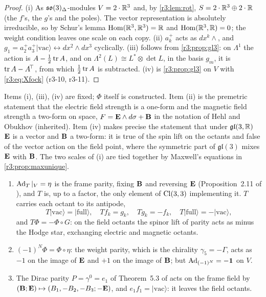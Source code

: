 \begin{proof}
(i) As $\mathfrak{so}(3)_\Delta$-modules $V=2\cdot\mathbb{R}^3$ and, by \cref{r3:lem:rot}, $S=2\cdot\mathbb{R}^3\oplus2\cdot\mathbb{R}$ (the $f$'s, the $g$'s and the poles). The
vector representation is absolutely irreducible, so by Schur's lemma \cite{GoodmanWallach} $\operatorname{Hom}(\mathbb{R}^3,\mathbb{R}^3)=\mathbb{R}$ and $\operatorname{Hom}(\mathbb{R}^3,\mathbb{R})=0$; the
weight condition leaves one scale on each copy. (ii) $a^+_k$ acts as $dx^k\wedge$, and $g_1=a^+_2a^+_3|\mathrm{vac}\rangle\leftrightarrow dx^2\wedge dx^3$
cyclically. (iii) follows from \cref{r3:prop:gl3}: on $\Lambda^1$ the action is $A-\tfrac12\operatorname{tr} A$, and on $\Lambda^2(L)\cong L^*\otimes\det L$, in the
basis $g_m$, it is $\operatorname{tr} A-A^{\!\top}$, from which $\tfrac12\operatorname{tr} A$ is subtracted. (iv) is \cref{r3:prop:gl3} on $V$ with \cref{r3:eq:Xfock}
(r3-10, r3-11).
\end{proof}

Items (i), (iii), (iv) are fixed; $\Phi$ itself is constructed. Item (ii) is the premetric statement that the electric field strength is a
one-form and the magnetic field strength a two-form on space, $F=\mathbf E\wedge d\sigma+\mathbf B$ in the notation of Hehl and Obukhov \cite{HehlObukhov03}
(inherited). Item (iv) makes precise the statement that under $\mathfrak{gl}(3,\mathbb{R})$ $\mathbf E$ is a vector and $\mathbf B$ a two-form: it is
true of the spin lift on the octants and false of the vector action on the field point, where the symmetric part of $\mathfrak{gl}(3)$
mixes $\mathbf E$ with $\mathbf B$. The two scales of (i) are tied together by Maxwell's equations in \cref{r3:prop:maxunique}.

\begin{proposition}
\label{r3:prop:parity}
\begin{enumerate}[label=(\roman*),leftmargin=2.2em]
\item $\operatorname{Ad}_T|_V=\eta$ is the frame parity, fixing $\mathbf B$ and reversing $\mathbf E$ (Proposition~2.11 of \cite{RE}), and $T$ is, up to a factor, the only
element of $\mathrm{Cl}(3,3)$ implementing it. $T$ carries each octant to its antipode,
\[
T|\mathrm{vac}\rangle=|\mathrm{full}\rangle,\quad Tf_k=g_k,\quad Tg_k=-f_k,\quad T|\mathrm{full}\rangle=-|\mathrm{vac}\rangle,
\]
and $T\Phi=-\Phi\circ G$: on the field octants the spinor lift of parity acts as minus the Hodge star, exchanging electric and magnetic octants.
\item $(-1)^N\Phi=\Phi\circ\eta$: the weight parity, which is the chirality $\gamma_5=-\Gamma$, acts as $-1$ on the image of $\mathbf E$ and $+1$ on the image
of $\mathbf B$; but $\operatorname{Ad}_{(-1)^N}=-\mathbf 1$ on $V$.
\item The Dirac parity $P=\gamma^0=e_1$ of Theorem~5.3 of \cite{ES17} acts on the frame field by
$(\mathbf B;\mathbf E)\mapsto(B_1,-B_2,-B_3;-\mathbf E)$, and $e_1f_1=|\mathrm{vac}\rangle$: it leaves the field octants.
\end{enumerate}
\end{proposition}

